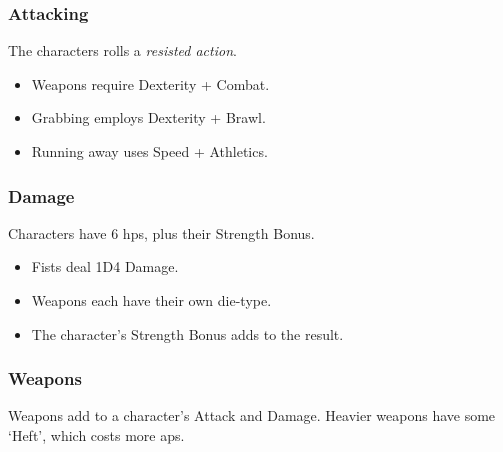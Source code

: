 \subsubsection*{Attacking}

The characters rolls a \textit{resisted action}.
\begin{itemize}
  \item
  Weapons require Dexterity + Combat.
  \item
  Grabbing employs Dexterity + Brawl.
  \item
  Running away uses Speed + Athletics.
\end{itemize}

\subsubsection*{Damage}

Characters have 6 \glspl{hp}, plus their Strength Bonus.

\begin{itemize}

  \item
  Fists deal 1D4 Damage.
  \item
  Weapons each have their own die-type.
  \item
  The character's Strength Bonus adds to the result.
\end{itemize}

\subsubsection*{Weapons}

Weapons add to a character's Attack and Damage.
Heavier weapons have some `Heft', which costs more \glspl{ap}.

